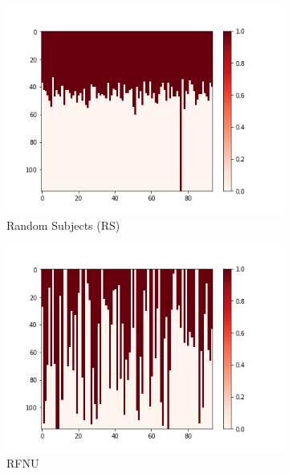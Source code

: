 \documentclass[10pt, conference, compsocconf]{IEEEtran}
\begin{document}
\begin{figure}[h!]
        \begin{subfigure}[b]{0.45\columnwidth}
                 \includegraphics[width=\columnwidth]{figures/5vs7_random-real_04_training}
                \caption{Random Subjects (RS)}
                  \label{fig:Uniform-S-Sample-Training-set}
        \end{subfigure}
        \begin{subfigure}[b]{0.45\columnwidth}
                  \includegraphics[width=\columnwidth]{figures/5vs7_diagonal_04_training}
                  \caption{RFNU}
                  \label{fig:Diagonal-Sample-Training-set}
        \end{subfigure}
        \begin{subfigure}[b]{0.45\columnwidth}

\end{subfigure}
\end{figure}
\end{document}
